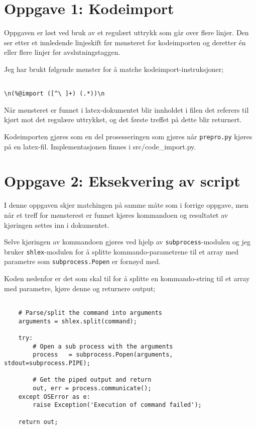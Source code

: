 \documentclass{article}
\renewenvironment{shadedwbar}{
\def\FrameCommand{\color[rgb]{0.7,     0.95686, 1}\vrule width 1mm\normalcolor\colorbox{shadecolor}}\FrameRule0.6pt
\MakeFramed {\advance\hsize-2mm\FrameRestore}\vskip3mm}{\vskip0mm\endMakeFramed}
\renewenvironment{shadedquoteBlueBar}[1][]{
\bgroup\rmfamily
\fboxsep=0mm\relax
\begin{shadedwbar}
\list{}{\parsep=-2mm\parskip=0mm\topsep=0pt\leftmargin=2mm
\rightmargin=2\leftmargin\leftmargin=4pt\relax}
\item\relax}
{\endlist\end{shadedwbar}\egroup}
\begin{document}
\section*{Oppgave 1: Kodeimport}

Oppgaven er løst ved bruk av et regulært uttrykk som går over flere linjer. Den ser etter et innledende linjeskift før mønsteret for kodeimporten og deretter én eller flere linjer før avslutningstaggen.

Jeg har brukt følgende mønster for å matche kodeimport-instruksjoner;

\begin{shadedquoteBlueBar}
\fontsize{9pt}{9pt}
\begin{Verbatim}

\n(%@import ([^\ ]+) (.*))\n
\end{Verbatim}
\end{shadedquoteBlueBar}
\noindent


Når mønsteret er funnet i latex-dokumentet blir innholdet i filen det referers til kjørt mot det regulære uttrykket, og det første treffet på dette blir returnert.

Kodeimporten gjøres som en del prosesseringen som gjøres når \verb;prepro.py; kjøres på en latex-fil. Implementasjonen finnes i src/code\_import.py.

\section*{Oppgave 2: Eksekvering av script}

I denne oppgaven skjer matchingen på samme måte som i forrige oppgave, men når et treff for mønsterest er funnet kjøres kommandoen og resultatet av kjøringen settes inn i dokumentet.

Selve kjøringen av kommandoen gjøres ved hjelp av \verb;subprocess;-modulen og jeg bruker \verb;shlex;-modulen for å splitte kommando-parametrene til et array med parametre som \verb;subprocess.Popen; er fornøyd med.

Koden nedenfor er det som skal til for å splitte en kommando-string til et array med parametre, kjøre denne og returnere output;

\begin{shadedquoteBlueBar}
\fontsize{9pt}{9pt}
\begin{Verbatim}

    # Parse/split the command into arguments
    arguments = shlex.split(command);

    try:
        # Open a sub process with the arguments
        process   = subprocess.Popen(arguments, stdout=subprocess.PIPE);

        # Get the piped output and return
        out, err = process.communicate();
    except OSError as e:
        raise Exception('Execution of command failed');

    return out;\end{Verbatim}
\end{shadedquoteBlueBar}
\noindent
\end{document}
